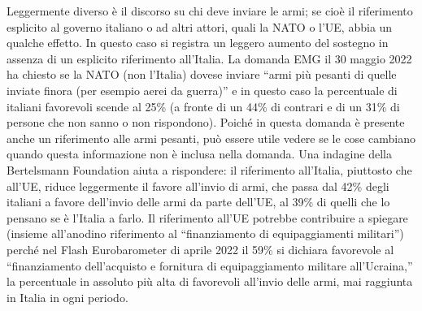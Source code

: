 \documentclass[
]{book}
\begin{document}
Leggermente diverso è il discorso su chi deve inviare le armi; se cioè il riferimento esplicito al governo italiano o ad altri attori, quali la NATO o l'UE, abbia un qualche effetto. In questo caso si registra un leggero aumento del sostegno in assenza di un esplicito riferimento all'Italia. La domanda EMG il 30 maggio 2022 ha chiesto se la NATO (non l'Italia) dovese inviare ``armi più pesanti di quelle inviate finora (per esempio aerei da guerra)'' e in questo caso la percentuale di italiani favorevoli scende al 25\% (a fronte di un 44\% di contrari e di un 31\% di persone che non sanno o non rispondono). Poiché in questa domanda è presente anche un riferimento alle armi pesanti, può essere utile vedere se le cose cambiano quando questa informazione non è inclusa nella domanda. Una indagine della Bertelsmann Foundation aiuta a rispondere: il riferimento all'Italia, piuttosto che all'UE, riduce leggermente il favore all'invio di armi, che passa dal 42\% degli italiani a favore dell'invio delle armi da parte dell'UE, al 39\% di quelli che lo pensano se è l'Italia a farlo. Il riferimento all'UE potrebbe contribuire a spiegare (insieme all'anodino riferimento al ``finanziamento di equipaggiamenti militari'') perché nel Flash Eurobarometer di aprile 2022 il 59\% si dichiara favorevole al ``finanziamento dell'acquisto e fornitura di equipaggiamento militare all'Ucraina,'' la percentuale in assoluto più alta di favorevoli all'invio delle armi, mai raggiunta in Italia in ogni periodo.
\end{document}
